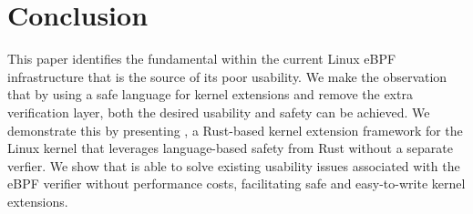 \section{Conclusion}
This paper identifies the fundamental \gap{} within the current Linux eBPF
    infrastructure that is the source of its poor usability.
We make the observation that by using a safe language for kernel extensions and
    remove the extra verification layer, both the desired usability and safety can be
    achieved.
We demonstrate this by presenting \projname{}, a Rust-based kernel extension
    framework for the Linux kernel that leverages language-based safety from
    Rust without a separate verfier.
We show that \projname{} is able to solve existing usability issues
    associated with the eBPF verifier without performance costs, facilitating
    safe and easy-to-write kernel extensions.